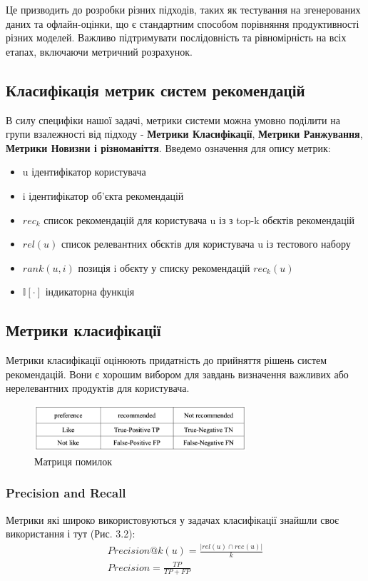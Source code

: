 Це призводить до розробки різних підходів, таких як тестування на
згенерованих даних та офлайн-оцінки, що є стандартним способом
порівняння продуктивності різних моделей. Важливо
підтримувати послідовність та рівномірність на всіх етапах,
включаючи метричний розрахунок.

\subsection{Класифікація метрик систем рекомендацій}
В силу специфіки нашої задачі, метрики системи можна умовно
поділити на групи взалежності від підходу -
\textbf{Метрики Класифікації},
\textbf{Метрики Ранжування},
\textbf{Метрики Новизни і різноманіття}. Введемо означення для опису метрик:
\begin{itemize}
    \item u  ідентифікатор користувача
    \item i  ідентифікатор об’єкта рекомендацій
    \item ${rec_k}$  список рекомендацій для користувача u із з top-k обєктів рекомендацій
    \item $rel(u)$  список релевантних обєктів для користувача u із тестового набору
    \item $rank(u,i)$  позиція i обєкту у списку рекомендацій $ rec_{k}(u)$
    \item $\mathbb{I}[\cdot] $  індикаторна функція
\end{itemize}
\subsection{Метрики класифікації}
Метрики класифікації оцінюють придатність до прийняття рішень систем рекомендацій. Вони є хорошим вибором для завдань визначення важливих або нерелевантних продуктів для користувача.

\begin{figure}
    \centering
    \includegraphics[width=0.7\textwidth]{images/confusion_m.png}
    \caption{Матриця помилок}
    \label{fig:conf_matrix}
\end{figure}
\subsubsection{Precision and Recall}
Метрики які широко використовуються у задачах класифікації знайшли своє використання і тут (Рис. 3.2):
\begin{align}
    Precision@k(u)=\frac{|rel(u) \cap rec_{}(u)|}{k} \\
    Precision = \frac{TP}{TP + FP}
\end{align}

